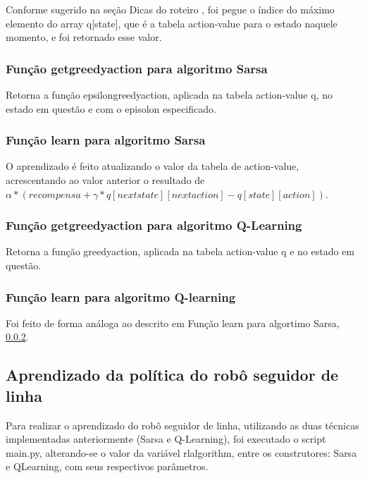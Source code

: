 \documentclass[conference]{IEEEtran}
\begin{document}
Conforme sugerido na seção Dicas do roteiro \cite{roteiro}, foi pegue o índice do máximo elemento do array q[state], que é a tabela action-value para o estado naquele momento, e foi retornado esse valor.

\subsubsection{Função get\underline{\space}greedy\underline{\space}action para algoritmo Sarsa}

Retorna a função epsilon\underline{\space}greedy\underline{\space}action, aplicada na tabela action-value q, no estado em questão e com o episolon especificado.

\subsubsection{Função learn para algoritmo Sarsa} \label{learn_sarsa}

O aprendizado é feito atualizando o valor da tabela de action-value, acrescentando ao valor anterior o resultado de $ \alpha * (recompensa + \gamma * q[next state][next action] - q[state][action])$.

\subsubsection{Função get\underline{\space}greedy\underline{\space}action para algoritmo Q-Learning}

Retorna a função greedy\underline{\space}action, aplicada na tabela action-value q e no estado em questão.

\subsubsection{Função learn para algoritmo Q-learning}

Foi feito de forma análoga ao descrito em Função learn para algortimo Sarsa, \ref{learn_sarsa}.

\subsection{Aprendizado da política do robô seguidor de linha}

Para realizar o aprendizado do robô seguidor de linha, utilizando as duas técnicas implementadas anteriormente (Sarsa e Q-Learning), foi executado o script main.py, alterando-se o valor da variável rl\underline{\space}algorithm, entre os construtores: Sarsa e QLearning, com seus respectivos parâmetros.
\end{document}
